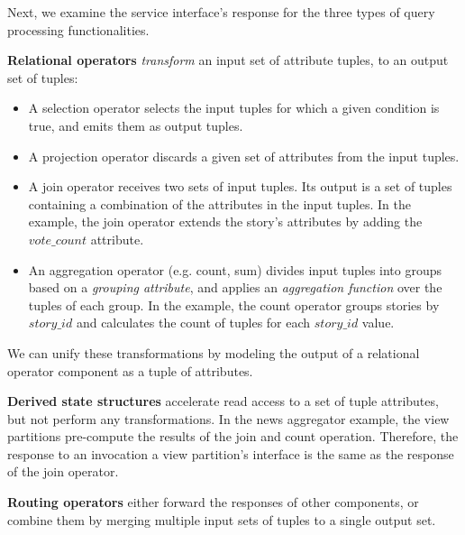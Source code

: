 Next, we examine the service interface's response for the three types of query processing functionalities.

  \medskip
  \noindent
  \textbf{Relational operators} \textit{transform} an input set of attribute tuples, to an output set of tuples:
    \begin{itemize}
    \item A selection operator selects the input tuples for which a given condition is true, and emits them as output tuples.
    \item A projection operator discards a given set of attributes from the input tuples.
    \item A join operator receives two sets of input tuples.
    Its output is a set of tuples containing a combination of the attributes in the input tuples.
    In the example, the join operator extends the story's attributes by adding the $vote\_count$ attribute.
    \item An aggregation operator (e.g. count, sum) divides input tuples into groups based on a \textit{grouping attribute},
    and applies an \textit{aggregation function} over the tuples of each group.
    In the example, the count operator groups stories by $story\_id$ and calculates the count of tuples for each $story\_id$
    value.
    \end{itemize}
  We can unify these transformations by modeling the output of a relational operator component as a tuple of attributes.

  \medskip
  \noindent
  \textbf{Derived state structures} accelerate read access to a set of tuple attributes,
  but not perform any transformations.
  In the news aggregator example, the view partitions pre-compute the results of the join and count operation.
  Therefore, the response to an invocation a view partition's interface is the same as the response of the join operator.

  \medskip
  \noindent
  \textbf{Routing operators} either forward the responses of other components, or combine them by merging
  multiple input sets of tuples to a single output set.

